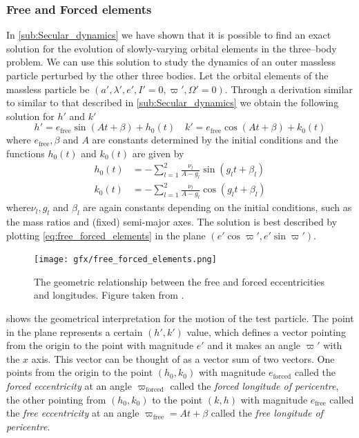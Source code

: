 \subsubsection*{Free and Forced elements}
In \cref{sub:Secular_dynamics} we have shown that it is possible to 
find an exact solution for the evolution of slowly-varying
orbital elements in the three--body problem. We can use this solution
to study the dynamics of an outer massless particle perturbed by 
the other three bodies. Let the orbital elements of the massless
particle be $(a',\lambda',e',I'=0,\varpi',\Omega'=0)$. Through a
derivation similar to similar to that described in 
\cref{sub:Secular_dynamics} \citep[see ch. 7 sec. 4 of][]{murray}
we obtain the following solution for $h'$ and $k'$
\begin{equation}
    h'=e_\text{free}\sin(At+\beta)+h_0(t)\quad
     k'=e_\text{free}\cos(At+\beta)+k_0(t)
     \label{eq:free_forced_elements}
\end{equation}
where $e_\text{free},\beta$ and $A$ are constants determined by
the initial conditions and the functions $h_0(t)$ and $k_0(t)$
are given by
\begin{align}
    h_0(t)&=-\sum^2_{l=1} \frac{\nu_l}{A-g_l} \sin(g_lt+\beta_l)\\
    k_0(t)&=-\sum^2_{l=1} \frac{\nu_l}{A-g_l} \cos(g_lt+\beta_l)
\end{align}
where$\nu_l,g_l$ and $\beta_l$ are again constants depending on 
the initial conditions, such as the mass ratios and (fixed)
semi-major axes. The solution is best described by plotting
\cref{eq:free_forced_elements} in the plane $(e'\cos\varpi',
e'\sin\varpi')$.
\begin{figure}[htb]
\centering
\texttt{[image: gfx/free\_forced\_elements.png]}
\caption{The geometric relationship between the free and forced
    eccentricities and longitudes. Figure taken from \cite{murray}.}
\label{fig:free_forced_elements}
\end{figure}
 shows the geometrical interpretation
for the motion of the test particle. The point in the plane represents
a certain $(h',k')$ value, which defines a vector pointing from the origin
to the point with magnitude $e'$ and it makes an angle $\varpi'$ with
the $x$ axis. This vector can be thought of as a vector sum of two 
vectors. One points from the origin to the point $(h_0, k_0)$ 
with magnitude $e_\text{forced}$ called the \emph{forced eccentricity} 
at an angle $\varpi_\text{forced}$ called the \emph{forced longitude 
of pericentre},  
the other pointing from
$(h_0,k_0)$ to the point $(k,h)$ with magnitude $e_\text{free}$ called
the \emph{free eccentricity} 
at an angle $\varpi_\text{free}=At+\beta$ called the \emph{free
longitude of pericentre}. 

